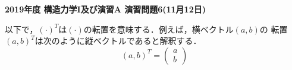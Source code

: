 \documentclass[10pt,a4j]{jarticle}
\newlength{\minitwocolumn}
\begin{document}
\newcommand{\fat}[1]{\mbox{\boldmath $#1$}}
\newcommand{\D}{\partial}
\newcommand{\w}{\omega}
\newcommand{\ga}{\alpha}
\newcommand{\gb}{\beta}
\newcommand{\gx}{\xi}
\newcommand{\gz}{\zeta}
\newcommand{\vhat}[1]{\hat{\fat{#1}}}
\newcommand{\spc}{\vspace{0.7\baselineskip}}
\newcommand{\halfspc}{\vspace{0.3\baselineskip}}

\pagestyle{empty}
\newcommand{\twofig}[2]
 {
   \begin{figure}[h]
     \begin{minipage}[t]{\minitwocolumn}
         \begin{center}   #1
         \end{center}
     \end{minipage}
         \hspace{\columnsep}
     \begin{minipage}[t]{\minitwocolumn}
         \begin{center} #2
         \end{center}
     \end{minipage}
   \end{figure}
 }
\begin{center}
{\Large \bf2019年度 構造力学I及び演習A 演習問題6(11月12日)} \\
\end{center}
以下で，$(\cdot)^T$は$(\cdot)$の転置を意味する．例えば，横ベクトル$(a,b)$の
転置$(a,b)^T$は次のように縦ベクトルであると解釈する．
\begin{equation}
	(a,b)^T=\left(
	\begin{array}{c}
		a \\
		b
	\end{array}
	\right)
	\nonumber
\end{equation}
\end{document}
